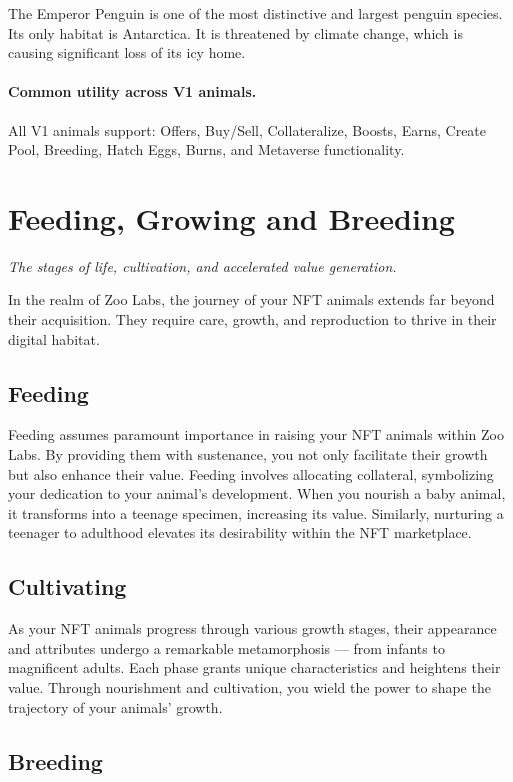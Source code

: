 The Emperor Penguin is one of the most distinctive and largest penguin species. Its only habitat is Antarctica. It is threatened by climate change, which is causing significant loss of its icy home.

\paragraph{Common utility across V1 animals.} All V1 animals support: Offers, Buy/Sell, Collateralize, Boosts, Earns, Create Pool, Breeding, Hatch Eggs, Burns, and Metaverse functionality.

\section{Feeding, Growing and Breeding}
\label{sec:feeding-growing}

\textit{The stages of life, cultivation, and accelerated value generation.}

In the realm of Zoo Labs, the journey of your NFT animals extends far beyond their acquisition. They require care, growth, and reproduction to thrive in their digital habitat.

\subsection{Feeding}

Feeding assumes paramount importance in raising your NFT animals within Zoo Labs. By providing them with sustenance, you not only facilitate their growth but also enhance their value. Feeding involves allocating collateral, symbolizing your dedication to your animal's development. When you nourish a baby animal, it transforms into a teenage specimen, increasing its value. Similarly, nurturing a teenager to adulthood elevates its desirability within the NFT marketplace.

\subsection{Cultivating}

As your NFT animals progress through various growth stages, their appearance and attributes undergo a remarkable metamorphosis --- from infants to magnificent adults. Each phase grants unique characteristics and heightens their value. Through nourishment and cultivation, you wield the power to shape the trajectory of your animals' growth.

\subsection{Breeding}

